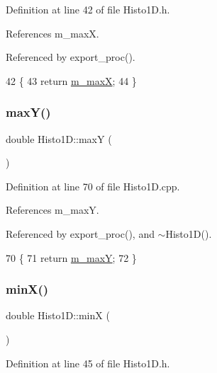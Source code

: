Definition at line 42 of file Histo1\+D.\+h.



References m\+\_\+maxX.



Referenced by export\+\_\+proc().


\begin{DoxyCode}
42                \{ 
43     \textcolor{keywordflow}{return} \hyperlink{classHisto1D_a6a5007569e096537f9b7b39d2aad865b}{m\_maxX}; 
44   \}
\end{DoxyCode}
\mbox{\label{classHisto1D_a60a1095ac5fbab109d20c54c2ee569a3}} 
\subsubsection{\texorpdfstring{max\+Y()}{maxY()}}
{\footnotesize\ttfamily double Histo1\+D\+::maxY (\begin{DoxyParamCaption}{ }\end{DoxyParamCaption})}



Definition at line 70 of file Histo1\+D.\+cpp.



References m\+\_\+maxY.



Referenced by export\+\_\+proc(), and $\sim$\+Histo1\+D().


\begin{DoxyCode}
70                     \{
71   \textcolor{keywordflow}{return} \hyperlink{classHisto1D_a28a8995424e36088c47643f8c1a7fa7f}{m\_maxY};
72 \}
\end{DoxyCode}
\mbox{\label{classHisto1D_abe9bf76799889414686794502e777b67}} 
\subsubsection{\texorpdfstring{min\+X()}{minX()}}
{\footnotesize\ttfamily double Histo1\+D\+::minX (\begin{DoxyParamCaption}{ }\end{DoxyParamCaption})\hspace{0.3cm}{\ttfamily [inline]}}



Definition at line 45 of file Histo1\+D.\+h.



